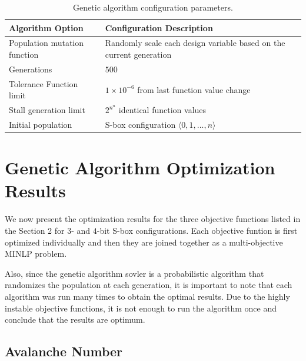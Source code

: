 \documentclass[11pt]{article}
\begin{document}
\begin{table}
	\centering
	\caption{Genetic algorithm configuration parameters.}
    \begin{tabular}{|l|l|}
        \hline
        \textbf{Algorithm Option} & \textbf{Configuration Description} \\ \hline
        Population mutation function & Randomly scale each design variable based on the current generation \\ 
        Generations & $500$ \\ 
        Tolerance Function limit & $1 \times 10^{-6}$ from last function value change \\ 
        Stall generation limit & $2^{n^n}$ identical function values \\ 
        Initial population & S-box configuration $\langle 0, 1, ..., n \rangle$ \\
        \hline
    \end{tabular}
	\label{configTable}
\end{table}

\section{Genetic Algorithm Optimization Results}

We now present the optimization results for the three objective functions listed in the Section 2 for $3$- and $4$-bit S-box configurations. Each objective funtion is first optimized individually and then they are joined together as a multi-objective MINLP problem. 

Also, since the genetic algorithm sovler is a probabilistic algorithm that randomizes the population at each generation, it is important to note that each algorithm was run many times to obtain the optimal results. Due to the highly instable objective functions, it is not enough to run the algorithm once and conclude that the results are optimum. 

\subsection{Avalanche Number}
\end{document}
